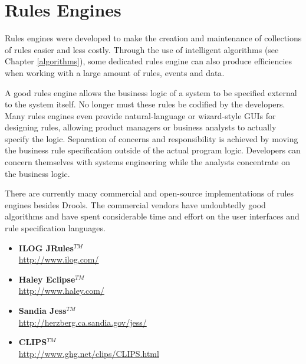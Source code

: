 \section{Rules Engines}

Rules engines were developed to make the creation and maintenance
of collections of rules easier and less costly.
Through the use of intelligent
algorithms (see Chapter \vref{algorithms}), some dedicated rules engine
can also produce efficiencies when working with a large amount of
rules, events and data.

A good rules engine allows the business logic of a system
to be specified external to the system itself.  No longer must these
rules be codified by the developers.  Many rules engines even provide
natural-language or wizard-style GUIs for designing rules, allowing
product managers or business analysts to actually specify the logic.
Separation of concerns and responsibility is achieved by moving the 
business rule specification outside of the actual program logic.
Developers can
concern themselves with systems engineering while the analysts 
concentrate on the business logic.

There are currently many commercial and open-source implementations
of rules engines besides Drools.  The commercial
vendors have undoubtedly good algorithms and have spent considerable
time and effort on the user interfaces and rule specification
languages.

\begin{itemize}
	\item \textbf{\textsf{ILOG JRules$^{TM}$}}\\
		 \url{http://www.ilog.com/}
	\item \textbf{\textsf{Haley Eclipse$^{TM}$}}\\
		 \url{http://www.haley.com/}
	\item \textbf{\textsf{Sandia Jess$^{TM}$}}\\
		 \url{http://herzberg.ca.sandia.gov/jess/}
	\item \textbf{\textsf{CLIPS$^{TM}$}}\\
		 \url{http://www.ghg.net/clips/CLIPS.html}
\end{itemize}


